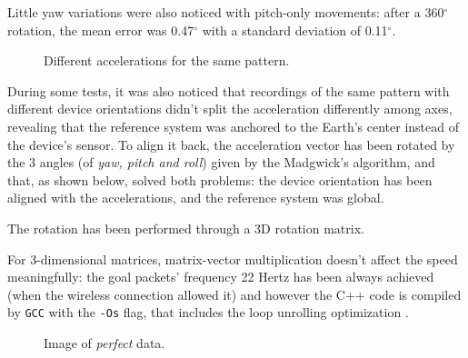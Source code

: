 Little yaw variations were also noticed with pitch-only movements: after a 360$^{\circ}$ rotation, the mean error was 0.47$^{\circ}$ with a standard deviation of 0.11$^{\circ}$.

\begin{center}
	\begin{figure}[ht]
		\caption{Different accelerations for the same pattern.}
	\end{figure}
\end{center}

During some tests, it was also noticed that recordings of the same pattern with different device orientations didn't split the acceleration differently among axes, revealing that the reference system was anchored to the Earth's center instead of the device's sensor. To align it back, the acceleration vector has been rotated by the 3 angles (of \textit{yaw, pitch and roll}) given by the Madgwick's algorithm, and that, as shown below, solved both problems: the device orientation has been aligned with the accelerations, and the reference system was global.
\bigbreak

The rotation has been performed through a 3D rotation matrix.
\bigbreak

For 3-dimensional matrices, matrix-vector multiplication doesn't affect the speed meaningfully: the goal packets' frequency 22 Hertz has been always achieved (when the wireless connection allowed it) and however the C++ code is compiled by \texttt{GCC} with the \texttt{-Os} flag, that includes the loop unrolling optimization \cite{UsingGCC}.

\begin{center}
	\begin{figure}[ht]
		\caption{Image of \textit{perfect} data.}
	\end{figure}
\end{center}

